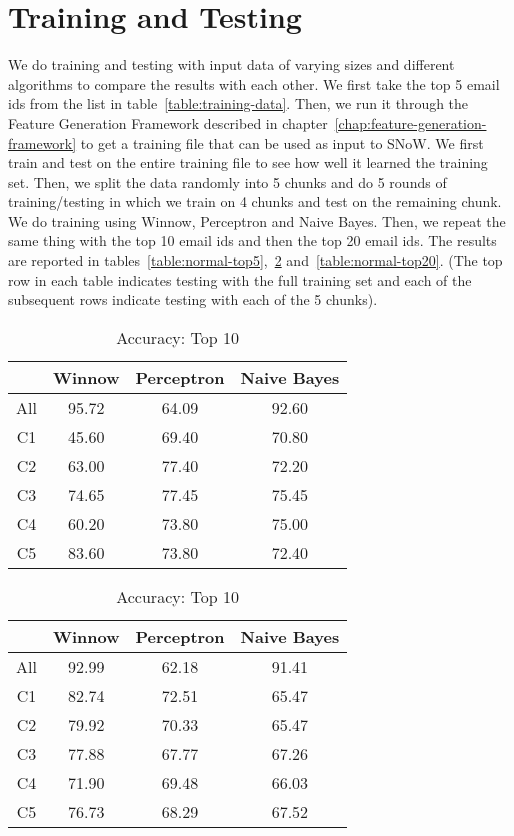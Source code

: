 \documentclass[senior,oneside]{UIUC}
\begin{document}
\section{Training and Testing}

We do training and testing with input data of varying sizes and different algorithms to compare the results with each other. We first take the top 5 email ids from the list in table~\ref{table:training-data}. Then, we run it through the Feature Generation Framework described in chapter~\ref{chap:feature-generation-framework} to get a training file that can be used as input to SNoW. We first train and test on the entire training file to see how well it learned the training set. Then, we split the data randomly into 5 chunks and do 5 rounds of training/testing in which we train on 4 chunks and test on the remaining chunk. We do training using Winnow, Perceptron and Naive Bayes. Then, we repeat the same thing with the top 10 email ids  and then the top 20 email ids. The results are reported in tables~\ref{table:normal-top5},~\ref{table:normal-top10} and~\ref{table:normal-top20}. (The top row in each table indicates testing with the full training set and each of the subsequent rows indicate testing with each of the 5 chunks).

\begin{table}
\parbox{.45\linewidth}{
\centering
\begin{tabular}{c | c c c}
\hline \hline
 & Winnow & Perceptron & Naive Bayes \\ [0.5ex]
\hline
All & 95.72 & 64.09 & 92.60 \\
C1 & 45.60 & 69.40 & 70.80 \\
C2 & 63.00 & 77.40 & 72.20 \\
C3 & 74.65 & 77.45 & 75.45 \\
C4 & 60.20 & 73.80 & 75.00 \\
C5 & 83.60 & 73.80 & 72.40 \\
\end{tabular}
\caption{Accuracy: Top 5}
\label{table:normal-top5}
}
\hfill
\parbox{.45\linewidth}{
\centering
\begin{tabular}{c | c c c}
\hline \hline
 & Winnow & Perceptron & Naive Bayes \\ [0.5ex]
\hline
All & 92.99 & 62.18 & 91.41 \\
C1 & 82.74 & 72.51 & 65.47 \\
C2 & 79.92 & 70.33 & 65.47 \\
C3 & 77.88 & 67.77 & 67.26 \\
C4 & 71.90 & 69.48 & 66.03 \\
C5 & 76.73 & 68.29 & 67.52 \\
\end{tabular}
\caption{Accuracy: Top 10}
\label{table:normal-top10}
}
\end{table}
\end{document}
